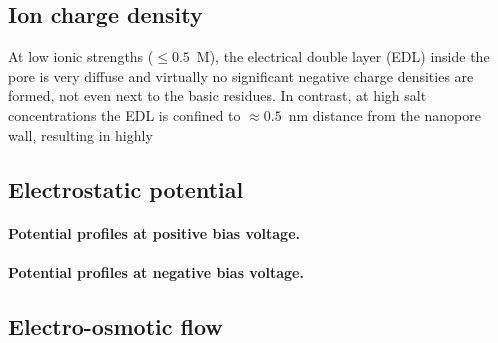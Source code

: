 \documentclass[journal=ancac3, manuscript=article, etalmode=truncate,maxauthors=0]{achemso}
\begin{document}
%


\subsection{Ion charge density}
At low ionic strengths ($\le0.5$~M), the electrical double layer (EDL) inside the pore is very diffuse and 
virtually no significant negative charge densities are formed, not even next to the basic residues. In 
contrast, at high salt concentrations the EDL is confined to $\approx0.5$~nm distance from the nanopore wall, 
resulting in highly 

\subsection{Electrostatic potential}

\paragraph{Potential profiles at positive bias voltage.}
\paragraph{Potential profiles at negative bias voltage.}




\subsection{Electro-osmotic flow}
\end{document}
